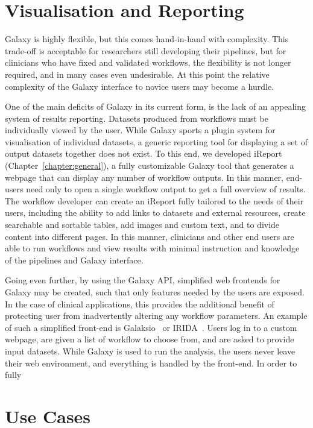 \section{Visualisation and Reporting}

Galaxy is highly flexible, but this comes hand-in-hand with complexity. This trade-off is acceptable for researchers still developing their pipelines, but for clinicians who have fixed and validated workflows, the flexibility is not longer required, and in many cases even undesirable. At this point the relative complexity of the Galaxy interface to novice users may become a hurdle.

One of the main deficits of Galaxy in its current form, is the lack of an appealing system of results reporting. Datasets produced from workflows must be individually viewed by the user. While Galaxy sports a plugin system for visualisation of individual datasets, a generic reporting tool for displaying a set of output datasets together does not exist. To this end, we developed iReport (Chapter~\ref{chapter:general}), a fully customizable Galaxy tool that generates a webpage that can display any number of workflow outputs. In this manner, end-users need only to open a single workflow output to get a full overview of results. The workflow developer can create an iReport fully tailored to the needs of their users, including the ability to add links to datasets and external resources, create searchable and sortable tables, add images and custom text, and to divide content into different pages. In this manner, clinicians and other end users are able to run workflows and view results with minimal instruction and knowledge of the pipelines and Galaxy interface.

Going even further, by using the Galaxy API, simplified web frontends for Galaxy may be created, such that only features needed by the users are exposed. In the case of clinical applications, this provides the additional benefit of protecting user from inadvertently altering any workflow parameters. An example of such a simplified front-end is Galaksio~\cite{galaksio} or IRIDA~\cite{TODO}. Users log in to a custom webpage, are given a list of workflow to choose from, and are asked to provide input datasets. While Galaxy is used to run the analysis, the users never leave their web environment, and everything is handled by the front-end. In order to fully


\section{Use Cases}

